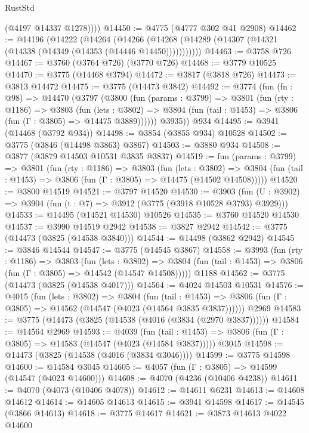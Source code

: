 \begin{lexlean}{RustStd}
\begin{coremodule}
          (@4197 @14337 @1278))))
@14450 := @4775 (@4777 @302 @41 @2908)
@14462 := @14196
    (@14222
      (@14264
        (@14266 (@14268 (@14289 (@14307 (@14321 (@14338 (@14349 (@14353 (@14446 @14450)))))))))))
@14463 := @3758 @726
@14467 := @3760 (@3764 @726) (@3770 @726)
@14468 := @3779 @10525
@14470 := @3775 (@14468 @3794)
@14472 := @3817 (@3818 @726)
@14473 := @3813 @14472
@14475 := @3775 (@14473 @3842)
@14492 := @3774
    (fun (fn : @98) =>
    @14470
      (@3797
        (@3800
          (fun (params : @3799) =>
          @3801
            (fun (rty : @1186) =>
            @3803
              (fun (lets : @3802) =>
              @3804 (fun (tail : @1453) => @3806 (fun (Γ : @3805) => @14475 @3889))))))
        @3935))
    @934
@14495 := @3941 (@14468 (@3792 @934))
@14498 := @3854 (@3855 @934) @10528
@14502 := @3775 (@3846 (@14498 @3863) @3867)
@14503 := @3880 @934
@14508 := @3877 (@3879 @14503 @10531 @3835 @3837)
@14519 := fun (params : @3799) =>
  @3801
    (fun (rty : @1186) =>
    @3803
      (fun (lets : @3802) =>
      @3804 (fun (tail : @1453) => @3806 (fun (Γ : @3805) => @14475 (@14502 @14508)))))
@14520 := @3800 @14519
@14521 := @3797 @14520
@14530 := @3903
    (fun (U : @3902) => @3904 (fun (t : @7) => @3912 (@3775 (@3918 @10528 @3793) @3929)))
@14533 := @14495 (@14521 @14530) @10526
@14535 := @3760 @14520 @14530
@14537 := @3990 @14519 @2942
@14538 := @3827 @2942
@14542 := @3775 (@14473 (@3825 (@14538 @3840)))
@14544 := @14498 (@3862 @2942)
@14545 := @3846 @14544
@14547 := @3775 (@14545 @3867)
@14558 := @3993
    (fun (rty : @1186) =>
    @3803
      (fun (lets : @3802) =>
      @3804 (fun (tail : @1453) => @3806 (fun (Γ : @3805) => @14542 (@14547 @14508)))))
    @1188
@14562 := @3775 (@14473 (@3825 (@14538 @4017)))
@14564 := @4024 @14503 @10531
@14576 := @4015
    (fun (lets : @3802) =>
    @3804
      (fun (tail : @1453) =>
      @3806 (fun (Γ : @3805) => @14562 (@14547 (@4023 (@14564 @3835 @3837))))))
    @2969
@14583 := @3775 (@14473 (@3825 (@14538 (@4016 (@3834 (@2970 @3837))))))
@14584 := @14564 @2969
@14593 := @4039
    (fun (tail : @1453) => @3806 (fun (Γ : @3805) => @14583 (@14547 (@4023 (@14584 @3837)))))
    @3045
@14598 := @14473 (@3825 (@14538 (@4016 (@3834 @3046))))
@14599 := @3775 @14598
@14600 := @14584 @3045
@14605 := @4057 (fun (Γ : @3805) => @14599 (@14547 (@4023 @14600)))
@14608 := @4070 (@4236 (@10406 @4238))
@14611 := @4070 (@4073 (@10406 @4078))
@14612 := @14611 @6231
@14613 := @14608 @14612
@14614 := @14605 @14613
@14615 := @3941 @14598
@14617 := @14545 (@3866 @14613)
@14618 := @3775 @14617
@14621 := @3873 @14613 @4022 @14600

\end{coremodule}
\end{lexlean}
